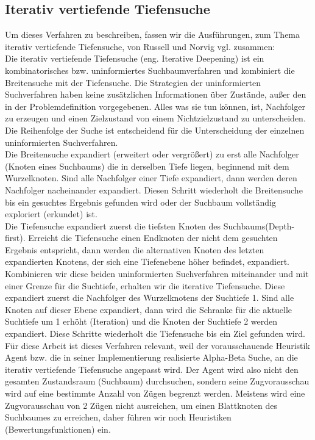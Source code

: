 \subsection{Iterativ vertiefende Tiefensuche}
\label{subsec:Iterativ vertiefende Tiefensuche}
Um dieses Verfahren zu beschreiben, fassen wir die Ausführungen, zum Thema iterativ vertiefende Tiefensuche, von Russell und Norvig vgl. \cite[116]{Russell} zusammen:\\

Die iterativ vertiefende Tiefensuche (eng. Iterative Deepening) ist ein kombinatorisches bzw. uninformiertes Suchbaumverfahren und kombiniert die Breitensuche mit der Tiefensuche. Die Strategien der uninformierten Suchverfahren haben keine zusätzlichen Informationen über Zustände, außer den in der Problemdefinition vorgegebenen. Alles was sie tun können, ist, Nachfolger zu erzeugen und einen Zielzustand von einem Nichtzielzustand zu unterscheiden. Die Reihenfolge der Suche ist entscheidend für die Unterscheidung der einzelnen uninformierten Suchverfahren. \\
 
Die Breitensuche expandiert (erweitert oder vergrößert) zu erst alle Nachfolger (Knoten eines Suchbaums) die in derselben Tiefe liegen, beginnend mit dem Wurzelknoten. Sind alle Nachfolger einer Tiefe expandiert, dann werden deren Nachfolger nacheinander expandiert. Diesen Schritt wiederholt die Breitensuche bis ein gesuchtes Ergebnis gefunden wird oder der Suchbaum vollständig exploriert (erkundet) ist. \\

Die Tiefensuche expandiert zuerst die tiefsten Knoten des Suchbaums(Depth-first). Erreicht die Tiefensuche einen Endknoten der nicht dem gesuchten Ergebnis entspricht, dann werden die alternativen Knoten des letzten expandierten Knotens, der sich eine Tiefenebene höher befindet, expandiert. \\

Kombinieren wir diese beiden uninformierten Suchverfahren miteinander und mit einer Grenze für die Suchtiefe, erhalten wir die iterative Tiefensuche. Diese expandiert zuerst die Nachfolger des Wurzelknotens der Suchtiefe 1. Sind alle Knoten auf dieser Ebene expandiert, dann wird die Schranke für die aktuelle Suchtiefe um 1 erhöht (Iteration) und die Knoten der Suchtiefe 2 werden expandiert. Diese Schritte wiederholt die Tiefensuche bis ein Ziel gefunden wird. \\  

Für diese Arbeit ist dieses Verfahren relevant, weil der vorausschauende Heuristik Agent bzw. die in seiner Implementierung realisierte Alpha-Beta Suche, an die iterativ vertiefende Tiefensuche angepasst wird. Der Agent wird also nicht den gesamten Zustandsraum (Suchbaum) durchsuchen, sondern seine Zugvorausschau wird auf eine bestimmte Anzahl von Zügen begrenzt werden. Meistens wird eine Zugvorausschau von 2 Zügen nicht ausreichen, um einen Blattknoten des Suchbaumes zu erreichen, daher führen wir noch Heuristiken (Bewertungsfunktionen) ein.\\

